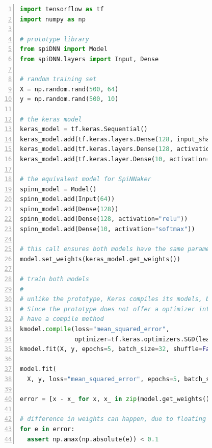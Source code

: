 \documentclass[]{article}
\begin{document}
\begin{figure} %
\begin{lstlisting}[language=Python, caption={Example code comparing
  training with Keras to training with the prototype. The code would
  result in a model (not the machine graph) akin to the one shown in
  Figure~\ref{fig:spiDNN_arch}.}, captionpos=b,
  label=lst:backprop, numbers=left]
import tensorflow as tf
import numpy as np

# prototype library
from spiDNN import Model
from spiDNN.layers import Input, Dense

# random training set
X = np.random.rand(500, 64)
y = np.random.rand(500, 10)

# the keras model
keras_model = tf.keras.Sequential()
keras_model.add(tf.keras.layers.Dense(128, input_shape=(64,)))
keras_model.add(tf.keras.layers.Dense(128, activation="relu"))
keras_model.add(tf.keras.layer.Dense(10, activation="softmax"))

# the equivalent model for SpiNNaker
spinn_model = Model()
spinn_model.add(Input(64))
spinn_model.add(Dense(128))
spinn_model.add(Dense(128, activation="relu"))
spinn_model.add(Dense(10, activation="softmax"))

# this call ensures both models have the same parameters
model.set_weights(keras_model.get_weights())

# train both models
#
# unlike the prototype, Keras compiles its models, before they can be trained.
# Since the prototype does not offer a optimizer interface yet, it does not
# have a compile method
kmodel.compile(loss="mean_squared_error",
               optimizer=tf.keras.optimizers.SGD(learning_rate=0.01))
kmodel.fit(X, y, epochs=5, batch_size=32, shuffle=False)

model.fit(
  X, y, loss="mean_squared_error", epochs=5, batch_size=32, learning_rate=0.01)

error = [x - x_ for x, x_ in zip(model.get_weights(), kmodel.get_weights())]

# difference in weights can happen, due to floating point errors
for e in error:
  assert np.amax(np.absolute(e)) < 0.1
\end{lstlisting}
\end{figure} %
\end{document}
